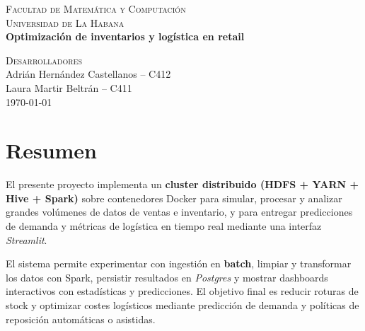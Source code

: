 \documentclass[12pt,a4paper]{article}
\begin{document}
	
	\begin{titlepage}
		\centering
		\vspace*{1cm}
		
		{\Large\scshape Facultad de Matemática y Computación}\\[6pt]
		{\large\textsc{Universidad de La Habana}}\\[2.2cm]
		
		{\huge\bfseries \textcolor{uhblue}{Optimización de inventarios y logística en retail}}\\[1.6cm]
		
		\vfill
		
		{\large\scshape Desarrolladores}\\[8pt]
		{\large Adrián Hernández Castellanos \quad -- \quad C412}\\[6pt]
		{\large Laura Martir Beltrán \quad -- \quad C411}\\[2.2cm]
		
		\vfill
		{\large \today}
		
		\vspace*{0.8cm}
	\end{titlepage}
	
	\tableofcontents
	\thispagestyle{empty}
	\newpage
	
	\section*{Resumen}
	El presente proyecto implementa un \textbf{cluster distribuido (HDFS + YARN + Hive + Spark)} sobre contenedores Docker para simular, procesar y analizar grandes volúmenes de datos de ventas e inventario, y para entregar predicciones de demanda y métricas de logística en tiempo real mediante una interfaz \textit{Streamlit}. 
	
	El sistema permite experimentar con ingestión en \textbf{batch}, limpiar y transformar los datos con Spark, persistir resultados en \textit{Postgres} y mostrar dashboards interactivos con estadísticas y predicciones. El objetivo final es reducir roturas de stock y optimizar costes logísticos mediante predicción de demanda y políticas de reposición automáticas o asistidas.
	
	\bigskip
	
\end{document}
